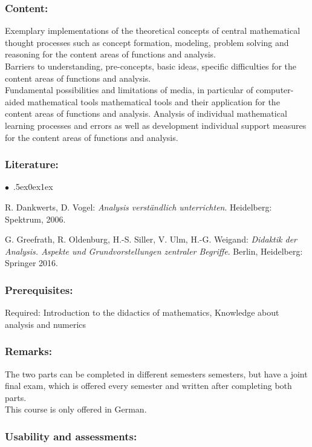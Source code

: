 \documentclass[a4paper,10pt]{article}
\renewenvironment{itemize}{\begin{list}{$\bullet$\ }{\itemsep.5ex\setlength{\topsep}{0.5\itemsep}\parsep0ex\labelsep1ex\settowidth{\labelwidth}{$\bullet$\ }\setlength{\leftmargin}{\labelwidth}\addtolength{\leftmargin}{3ex}\addtolength{\leftmargin}{\labelsep}}}{\end{list}}
\begin{document}
\subsubsection*{\large
    Content:
}
Exemplary implementations of the theoretical concepts of central mathematical thought processes such as concept formation, modeling, problem solving and reasoning for the content areas of functions and analysis. \\
Barriers to understanding, pre-concepts, basic ideas, specific difficulties for the content areas of functions
and analysis. \\
Fundamental possibilities and limitations of media, in particular of computer-aided mathematical tools mathematical tools and their application for the content areas of functions and analysis.
Analysis of individual mathematical learning processes and errors as well as development individual support measures for
the content areas of functions and analysis.
\subsubsection*{\large
    Literature:
}
\begin{itemize}
\item
R. Dankwerts, D. Vogel: \emph{Analysis verständlich unterrichten}. Heidelberg: Spektrum, 2006. 
 \item
G. Greefrath, R. Oldenburg, H.-S. Siller, V. Ulm, H.-G. Weigand: \emph{Didaktik der Analysis. Aspekte und Grundvorstellungen zentraler Begriffe}. Berlin, Heidelberg: Springer 2016.
\end{itemize}
\subsubsection*{\large
    Prerequisites:
}
Required: Introduction to the didactics of mathematics, Knowledge about analysis and numerics
\subsubsection*{\large
    Remarks:
}
The two parts can be completed in different semesters semesters, but have a joint final exam, which is offered every semester and written after completing both parts. \\ This course is only offered in German.
\cleardoublepage
\subsubsection*{\large
    Usability and assessments:
}
\end{document}
